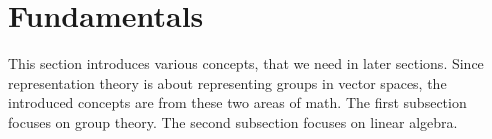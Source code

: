 \section{Fundamentals}

This section introduces various concepts, that we need in later sections.
Since representation theory is about representing groups in vector spaces, the introduced concepts are from these two areas of math.
The first subsection focuses on group theory.
The second subsection focuses on linear algebra.



